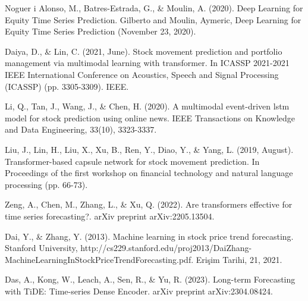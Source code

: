 \documentclass{article}
\begin{document}
\begin{thebibliography}{9}
  Noguer i Alonso, M., Batres-Estrada, G., \& Moulin, A. (2020). Deep Learning for Equity Time Series Prediction. Gilberto and Moulin, Aymeric, Deep Learning for Equity Time Series Prediction (November 23, 2020).

  Daiya, D., \& Lin, C. (2021, June). Stock movement prediction and portfolio management via multimodal learning with transformer. In ICASSP 2021-2021 IEEE International Conference on Acoustics, Speech and Signal Processing (ICASSP) (pp. 3305-3309). IEEE.

  Li, Q., Tan, J., Wang, J., \& Chen, H. (2020). A multimodal event-driven lstm model for stock prediction using online news. IEEE Transactions on Knowledge and Data Engineering, 33(10), 3323-3337.

  Liu, J., Lin, H., Liu, X., Xu, B., Ren, Y., Diao, Y., \& Yang, L. (2019, August). Transformer-based capsule network for stock movement prediction. In Proceedings of the first workshop on financial technology and natural language processing (pp. 66-73).

  Zeng, A., Chen, M., Zhang, L., \& Xu, Q. (2022). Are transformers effective for time series forecasting?. arXiv preprint arXiv:2205.13504.

  Dai, Y., \& Zhang, Y. (2013). Machine learning in stock price trend forecasting. Stanford University, http://cs229.stanford.edu/proj2013/DaiZhang-MachineLearningInStockPriceTrendForecasting.pdf. Erişim Tarihi, 21, 2021.

  Das, A., Kong, W., Leach, A., Sen, R., \& Yu, R. (2023). Long-term Forecasting with TiDE: Time-series Dense Encoder. arXiv preprint arXiv:2304.08424.
\end{thebibliography}
\end{document}
